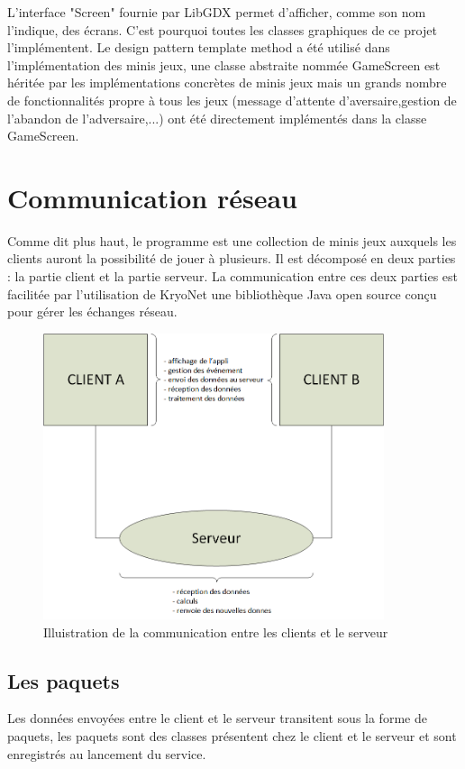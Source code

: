 \documentclass{report}
\begin{document}
L'interface "Screen" fournie par LibGDX permet d'afficher, comme son nom l'indique, des écrans. C'est pourquoi toutes les classes graphiques de ce
projet l'implémentent. Le design pattern template method a été utilisé dans l'implémentation des minis jeux, une classe abstraite nommée GameScreen est héritée
par les implémentations concrètes de minis jeux mais un grands nombre de fonctionnalités propre à tous les jeux (message d'attente d'aversaire,gestion de l'abandon de l'adversaire,...)
ont été directement implémentés dans la classe GameScreen.

\chapter{Communication réseau}
Comme dit plus haut, le programme est une collection de minis jeux auxquels les clients auront la possibilité de jouer à
plusieurs. Il est décomposé en deux parties : la partie client et la partie serveur. La communication entre ces
deux parties est facilitée par l'utilisation de KryoNet une bibliothèque Java open source conçu pour gérer les échanges réseau.

\begin{figure}[H]
	\centering\includegraphics[width=10cm]{maquette_Base}
	\caption{Illuistration de la communication entre les clients et le serveur}
\end{figure}


\section{Les paquets}
Les données envoyées entre le client et le serveur transitent sous la forme de paquets, les paquets sont des classes présentent
chez le client et le serveur et sont enregistrés au lancement du service.
\end{document}
